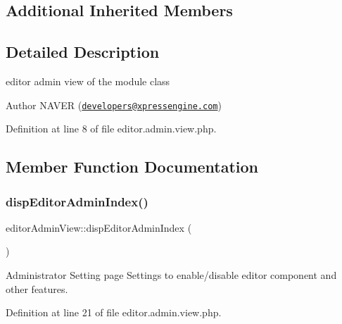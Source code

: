 \subsection*{Additional Inherited Members}


\subsection{Detailed Description}
editor admin view of the module class 

\begin{DoxyAuthor}{Author}
N\+A\+V\+ER (\href{mailto:developers@xpressengine.com}{\tt developers@xpressengine.\+com}) 
\end{DoxyAuthor}


Definition at line 8 of file editor.\+admin.\+view.\+php.



\subsection{Member Function Documentation}
\hypertarget{classeditorAdminView_ae8fadbf37f9efc8389c45e7171eba8be}{}\label{classeditorAdminView_ae8fadbf37f9efc8389c45e7171eba8be} 
\subsubsection{\texorpdfstring{disp\+Editor\+Admin\+Index()}{dispEditorAdminIndex()}}
{\footnotesize\ttfamily editor\+Admin\+View\+::disp\+Editor\+Admin\+Index (\begin{DoxyParamCaption}{ }\end{DoxyParamCaption})}



Administrator Setting page Settings to enable/disable editor component and other features. 



Definition at line 21 of file editor.\+admin.\+view.\+php.

\hypertarget{classeditorAdminView_aeebafdbe84d4360ae45481f13981ca00}{}\label{classeditorAdminView_aeebafdbe84d4360ae45481f13981ca00} 
